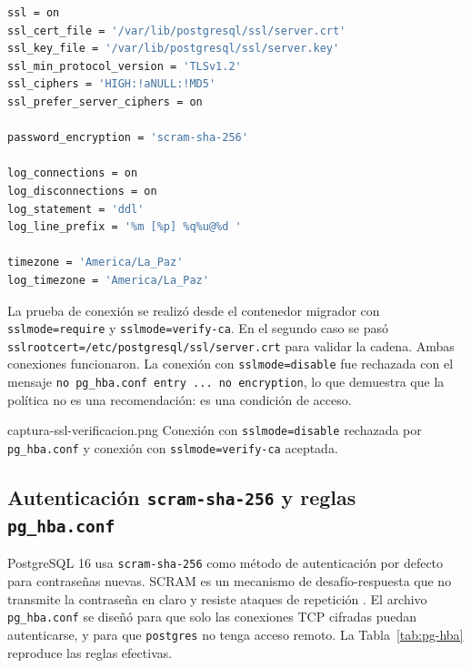 \begin{lstlisting}[language=bash,caption={Configuración TLS y de auditoría en \texttt{postgresql.conf}},label={lst:postgresql-conf}]
ssl = on
ssl_cert_file = '/var/lib/postgresql/ssl/server.crt'
ssl_key_file = '/var/lib/postgresql/ssl/server.key'
ssl_min_protocol_version = 'TLSv1.2'
ssl_ciphers = 'HIGH:!aNULL:!MD5'
ssl_prefer_server_ciphers = on

password_encryption = 'scram-sha-256'

log_connections = on
log_disconnections = on
log_statement = 'ddl'
log_line_prefix = '%m [%p] %q%u@%d '

timezone = 'America/La_Paz'
log_timezone = 'America/La_Paz'
\end{lstlisting}

La prueba de conexión se realizó desde el contenedor migrador con
\texttt{sslmode=require} y \texttt{sslmode=verify-ca}. En el segundo caso se
pasó \texttt{sslrootcert=/etc/postgresql/ssl/server.crt} para validar la
cadena. Ambas conexiones funcionaron. La conexión con \texttt{sslmode=disable}
fue rechazada con el mensaje \texttt{no pg\_hba.conf entry ... no encryption},
lo que demuestra que la política no es una recomendación: es una condición
de acceso.

%
  {captura-ssl-verificacion.png}%
  {Conexión con \texttt{sslmode=disable} rechazada por \texttt{pg\_hba.conf} y conexión con \texttt{sslmode=verify-ca} aceptada.}

\subsection{Autenticación \texttt{scram-sha-256} y reglas \texttt{pg\_hba.conf}}

PostgreSQL 16 usa \texttt{scram-sha-256} como método de autenticación por
defecto para contraseñas nuevas. SCRAM es un mecanismo de desafío-respuesta
que no transmite la contraseña en claro y resiste ataques de repetición
\citep{rfc5802,rfc7677}. El archivo \texttt{pg\_hba.conf} se diseñó para que
solo las conexiones TCP cifradas puedan autenticarse, y para que
\texttt{postgres} no tenga acceso remoto. La Tabla~\ref{tab:pg-hba} reproduce
las reglas efectivas.

